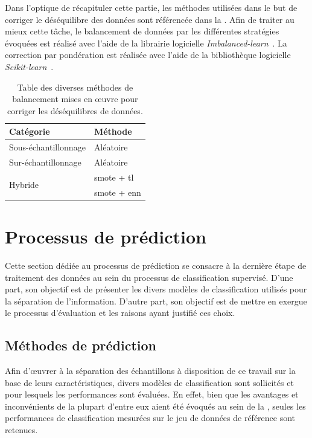 Dans l'optique de récapituler cette partie, les méthodes utilisées dans le but de corriger le déséquilibre des données sont référencée dans la . Afin de traiter au mieux cette tâche, le balancement de données par les différentes stratégies évoquées est réalisé avec l'aide de la librairie logicielle \textit{Imbalanced-learn}~\cite{Lemaitre2017}. La correction par pondération est réalisée avec l'aide de la bibliothèque logicielle \textit{Scikit-learn}~\cite{pedregosa2011}.\par

\begin{table}[H]
    \centering
    \begin{tabular}{ll}
        \toprule
        \textbf{Catégorie}                  & \textbf{Méthode}          \\ \hline
        Sous-échantillonnage                & Aléatoire                 \\ \hline
        Sur-échantillonnage                 & Aléatoire                 \\ \hline
        \multirow{2}{*}{Hybride}            & \gls{smote} + \gls{tl}    \\ \cline{2-2}
                                            & \gls{smote} + \gls{enn}   \\ \bottomrule
    \end{tabular}
    \caption{Table des diverses méthodes de balancement mises en œuvre pour corriger les déséquilibres de données.}
    \label{tab:summary_balancement_methods}
\end{table}\par

\section{Processus de prédiction}
Cette section dédiée au processus de prédiction se consacre à la dernière étape de traitement des données au sein du processus de classification supervisé. D'une part, son objectif est de présenter les divers modèles de classification utilisés pour la séparation de l'information. D'autre part, son objectif est de mettre en exergue le processus d'évaluation et les raisons ayant justifié ces choix.\par

\subsection{Méthodes de prédiction}
Afin d'œuvrer à la séparation des échantillons à disposition de ce travail sur la base de leurs caractéristiques, divers modèles de classification sont sollicités et pour lesquels les performances sont évaluées. En effet, bien que les avantages et inconvénients de la plupart d'entre eux aient été évoqués au sein de la , seules les performances de classification mesurées sur le jeu de données de référence sont retenues.\par

